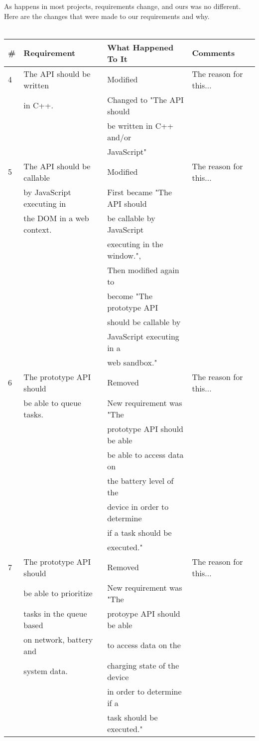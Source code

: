 \documentclass[12pt]{article}
\begin{document}
As happens in most projects, requirements change, and ours was no different. Here are the changes that were made to our requirements and why.\\\\
\begin{tabular}{|l|l|l|l|}
\hline
\#  & Requirement 				& What Happened To It 		  & Comments \\ \hline
4	& The API should be written & Modified 					  & The reason for this... \\
	& in C++.					& Changed to "The API should  & \\
	&							& be written in C++ and/or	  & \\
	&							& JavaScript" 				  & \\ \hline
5 	& The API should be callable& Modified 					  & The reason for this... \\
	& by JavaScript executing in& First became "The API should& \\
	& the DOM in a web context. & be callable by JavaScript   & \\
	&							& executing in the window.",  & \\
	&							& Then modified again to 	  & \\
	&							& become "The prototype API   & \\
	&							& should be callable by 	  & \\
	&							& JavaScript executing in a   & \\
	&							& web sandbox." 			  & \\ \hline
6 	& The prototype API should  & Removed 				 	  & The reason for this... \\
	& be able to queue tasks. 	& New requirement was "The 	  & \\
	& 						 	& prototype API should be able& \\
	&							& be able to access data on   & \\
	&							& the battery level of the    & \\
	&							& device in order to determine& \\
	&							& if a task should be 		  & \\
	&							& executed." 				  & \\ \hline
7 	& The prototype API should  & Removed				 	  & The reason for this... \\
	& be able to prioritize		& New requirement was "The 	  & \\
	& tasks in the queue based	& protoype API should be able & \\
	& on network, battery and 	& to access data on the 	  & \\
	& system data.				& charging state of the device& \\
	&							& in order to determine if a  & \\
	&							& task should be executed."   & \\ \hline
\end{tabular}
\pagebreak
\end{document}
